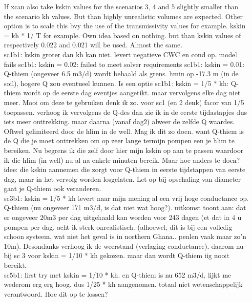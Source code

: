 If xcan also take kskin values for the scenarios 3, 4 and 5 slightly smaller than the scenario kh values. But than highly unrealistic volumes are expected. Other option is to scale this bvy the use of the transmissivity values for example. kskin = kh * 1/ T for example. Own idea based on nothing. but than kskin values of respectively 0.022 and 0.021 will be used. Almost the same. \\

sc1b1: kskin groter dan kh kan niet. levert negatieve CWC en cond op. model fails
sc1b1: kskin = 0.02: failed to meet solver requirements
sc1b1: kskin = 0.01: Q-thiem (ongeveer 6.5 m3/d) wordt behaald als grens. hmin op -17.3 m (in de soil), hogere Q zou eventueel kunnen. Is een optie
sc1b1: kskin = 1/5 * kh: Q-thiem wordt op de eerste dag eventjes aangetikt. maar vervolgens elke dag niet meer. Mooi om deze te gebruiken denk ik zo.  voor sc1 (en 2 denk) facor van 1/5 toepassen. verhoog ik vervolgens de Q-des dan zie ik in de eerste tijdastapjes dus iets meer onttrekking. maar daarna  (vanaf dag2) alweer de zelfde Q waardes. Oftwel gelimiteerd door de hlim in de well. Mag ik dit zo doen. want Q-thiem is de Q die je moet onttrekken om op zeer lange termijn pompen een je hlim te bereiken. Nu begrens ik die zelf door hier mijn kskin op aan te passen waardoor ik die hlim (in well) nu al na enkele minuten bereik. Maar hoe anders te doen? \\

idee: die kskin aannemen die zorgt voor Q-thiem in eerste tijdstappen van eerste dag, maar in het vervolg worden losgelaten. Let op bij opschaling van diameter gaat je Q-thiem ook veranderen. \\


sc3b1: kskin = 1/5 * kh levert naar mijn mening al een vrij hoge conductance op. Q-thiem (nu ongeveer 171 m3/d, is dat niet wat hoog?). uitkomst toont aan: dat er ongeveer 20m3 per dag uitgehaald kan worden voor 243 dagen (et dat in 4 u pompen per dag. acht ik sterk onrealistisch. (alhoewel, dit is bij een volledig schoon systeem, wat niet het geval is in northern Ghana.. penlen vaak maar zo'n 10m). Desondanks verhoog ik de weerstand (verlaging conductance). daarom nu bij sc 3 voor kskin = 1/10 * kh gekozen. maar dan wordt Q-thiem iig nooit bereikt. \\


sc5b1: first try met kskin = 1/10 * kh. en Q-thiem is nu 652 m3/d, lijkt me wederom erg erg hoog. dus 1/25 * kh aangenomen. totaal niet wetenschappelijk verantwoord. Hoe dit op te lossen? \\


